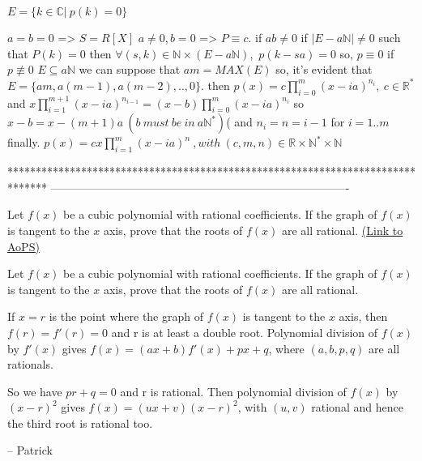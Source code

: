 \begin{solution}
	$E=\{k\in \mathbb{C}| \ p(k)=0\}$

$a=b=0$ => $S=R[X]$
$a\neq 0,b=0$ => $P\equiv c$.
if $ab\neq 0$
if $|E-a\mathbb{N}|\neq 0$ such that $P(k)=0$
then $\forall (s,k)\in \mathbb{N}\times (E-a\mathbb{N}),$ $p(k-sa)=0$ so, $p\equiv 0$
if $p\not\equiv 0$
$E\subseteq a\mathbb{N}$
we can suppose that $am=MAX(E)$ so, it's evident that $E=\{am,a(m-1),a(m-2),..,0\}$.
then $p(x)=c\prod_{i=0}^{m}(x-ia)^{n_{i}},\ c\in\mathbb{R}^{*}$
and $x\prod_{i=1}^{m+1}(x-ia)^{n_{i-1}}=(x-b)\prod_{i=0}^{m}(x-ia)^{n_{i}}$
so $x-b=x-(m+1)a\ (b\ must\ be\ in\ a\mathbb{N}^{*})$( and $n_{i}=n={i-1}$ for $i=1..m$
finally.
$p(x)=cx\prod_{i=1}^{m}(x-ia)^{n}\ ,with\ (c,m,n)\in \mathbb{R}\times \mathbb{N}^{*}\times \mathbb{N}$
\end{solution}
*******************************************************************************
-------------------------------------------------------------------------------

\begin{problem}
	Let $f(x)$ be a cubic polynomial with rational coefficients. If the graph of $f(x)$ is tangent to the $x$ axis, prove that the roots of $f(x)$ are all rational.
	\flushright \href{https://artofproblemsolving.com/community/c6h149390}{(Link to AoPS)}
\end{problem}



\begin{solution}
	\begin{tcolorbox}Let $f(x)$ be a cubic polynomial with rational coefficients. If the graph of $f(x)$ is tangent to the $x$ axis, prove that the roots of $f(x)$ are all rational.\end{tcolorbox}

If $x=r$ is the point where the graph of $f(x)$ is tangent to the $x$ axis, then $f(r)=f'(r)=0$ and r is at least a double root.
Polynomial division of $f(x)$ by $f'(x)$ gives $f(x)=(ax+b)f'(x)+px+q$, where $(a,b,p,q)$ are all rationals.

So we have $pr+q=0$ and r is rational.
Then polynomial division of $f(x)$ by $(x-r)^{2}$ gives $f(x)=(ux+v)(x-r)^{2}$, with $(u,v)$ rational and hence the third root is rational too.

-- 
Patrick
\end{solution}



